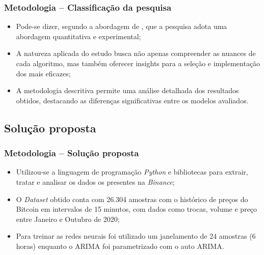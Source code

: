 \documentclass[aspectratio=169]{beamer}
\begin{document}
\begin{frame}[fragile] \frametitle{Metodologia -- Classificação da pesquisa}
	\begin{itemize}
		\item Pode-se dizer, segundo a abordagem de \textcite{pesquisa}, que a pesquisa adota uma abordagem quantitativa e experimental;
		
		\item A natureza aplicada do
    estudo busca não apenas compreender as nuances de cada algoritmo, mas também oferecer
    insights para a seleção e implementação dos mais eficazes;
		
		\item A metodologia descritiva permite
    uma análise detalhada dos resultados obtidos, destacando as diferenças significativas entre
    os modelos avaliados.
	\end{itemize}
\end{frame}


\subsection{Solução proposta}

\begin{frame}[fragile] \frametitle{Metodologia -- Solução proposta}
	\begin{itemize}
		\item Utilizou-se a linguagem de programação \textit{Python} e bibliotecas para extrair, tratar e analisar os dados os presentes na \textit{Binance};
		
		\item O \textit{Dataset} obtido conta com 26.304 amostras com o histórico de preços do Bitcoin em intervalos de 15 minutos, com dados como trocas, volume e preço entre Janeiro e Outubro de 2020;
		\item Para treinar as redes neurais foi utilizado um janelamento de 24 amostras (6 horas) enquanto o ARIMA foi parametrizado com o auto ARIMA.
	\end{itemize}
\end{frame}
\end{document}
